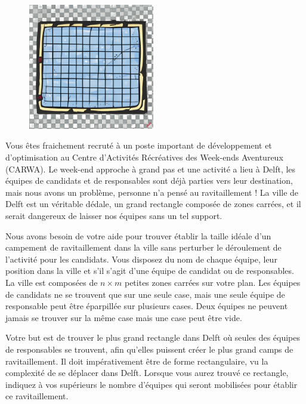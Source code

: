 \problemname{\problemyamlname}


\begin{figure}
    \centering
    \includegraphics[width=5.5cm]{ravitaillement.jpg}
\end{figure}
Vous êtes fraichement recruté à un poste important de développement et
d'optimisation au Centre d'Activités Récréatives des Week-ends
Aventureux (CARWA). Le week-end approche à grand pas et une activité a lieu à Delft,
les équipes de candidats et de responsables sont déjà parties vers leur destination,
mais nous avons un problème, personne n'a pensé au ravitaillement !
La ville de Delft est un véritable dédale, un grand rectangle composée de zones carrées,
et il serait dangereux de laisser nos équipes sans un tel support.

Nous avons besoin de votre aide pour trouver établir la taille idéale d'un
campement de ravitaillement dans la ville sans perturber le déroulement de l'activité pour les candidats.
Vous disposez du nom de chaque équipe, leur position dans la ville et s'il s'agit d'une
équipe de candidat ou de responsables. La ville est composées de $n \times m$ petites zones carrées sur votre plan.
Les équipes de candidats ne se trouvent que sur une seule case, mais une seule équipe de responsable peut être éparpillée sur plusieurs cases.
Deux équipes ne peuvent jamais se trouver sur la même case mais une case peut être vide.

Votre but est de trouver le plus grand rectangle dans Delft où
seules des équipes de responsables se trouvent, afin qu'elles puissent créer le plus
grand camps de ravitaillement. Il doit impérativement être de forme rectangulaire, vu la complexité de se déplacer dans Delft.
Lorsque vous aurez trouvé ce rectangle, indiquez à vos supérieurs le nombre d'équipes qui seront mobilisées pour établir ce ravitaillement.

